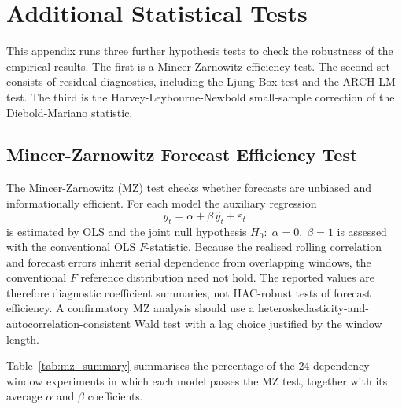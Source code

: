 \section{Additional Statistical Tests}
\label{app:tests}

This appendix runs three further hypothesis tests to check the robustness of the empirical results. The first is a Mincer-Zarnowitz efficiency test. The second set consists of residual diagnostics, including the Ljung-Box test and the ARCH LM test. The third is the Harvey-Leybourne-Newbold small-sample correction of the Diebold-Mariano statistic.

\subsection{Mincer-Zarnowitz Forecast Efficiency Test}

The Mincer-Zarnowitz (MZ) test \cite{mincer1969economic} checks whether forecasts
are unbiased and informationally efficient.
For each model the auxiliary regression
\begin{equation}
    y_t = \alpha + \beta\,\hat{y}_t + \varepsilon_t
\end{equation}
is estimated by OLS and the joint null hypothesis $H_0{:}\;\alpha = 0,\;\beta = 1$
is assessed with the conventional OLS $F$-statistic. Because the realised rolling
correlation and forecast errors inherit serial dependence from overlapping windows,
the conventional $F$ reference distribution need not hold. The reported values are
therefore diagnostic coefficient summaries, not HAC-robust tests of forecast
efficiency. A confirmatory MZ analysis should use a heteroskedasticity-and-
autocorrelation-consistent Wald test with a lag choice justified by the window length.

Table~\ref{tab:mz_summary} summarises the percentage of the 24
dependency–window experiments in which each model passes the MZ test,
together with its average $\alpha$ and $\beta$ coefficients.


